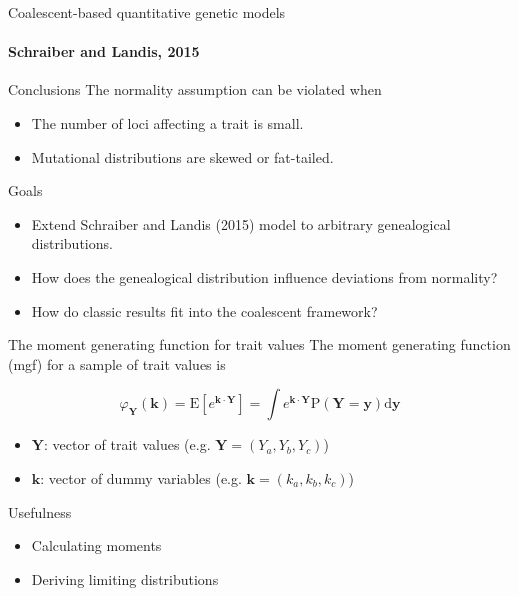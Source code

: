 \documentclass{beamer}
\newcommand{\E}{\mathrm{E}}
\newcommand{\Pro}{\mathrm{P}}
\begin{document}
\begin{frame}{Coalescent-based quantitative genetic models}
  \framesubtitle{Schraiber and Landis, 2015}
  \begin{block}{Conclusions}
    The normality assumption can be violated when
    \begin{itemize}
    \item The number of loci affecting a trait is small.
    \item Mutational distributions are skewed or fat-tailed.
    \end{itemize}
  \end{block}
\end{frame}

\begin{frame}{Goals}
  \begin{itemize}
  \item Extend Schraiber and Landis (2015) model to arbitrary genealogical
    distributions.
  \item How does the genealogical distribution influence deviations from
    normality?
  \item How do classic results fit into the coalescent framework?
  \end{itemize}
\end{frame}

\begin{frame}{The moment generating function for trait values}
  The moment generating function (mgf) for a sample of trait values is 
  \begin{definition}
    \begin{equation*}
      \varphi_{\mathbf{Y}}(\mathbf{k}) = \E\left[ e^{\mathbf{k} \cdot \mathbf{Y}} \right] =
      \int e^{\mathbf{k} \cdot \mathbf{Y}} \Pro(\mathbf{Y}=\mathbf{y}) \mbox{d}\mathbf{y}
    \end{equation*}
  \end{definition}
  \begin{itemize}
  \item $\mathbf{Y}$: vector of trait values (e.g. $\mathbf{Y} = (Y_a, Y_b, Y_c)$)
  \item $\mathbf{k}$: vector of dummy variables (e.g. $\mathbf{k} = (k_a, k_b, k_c)$)
  \end{itemize}
  \begin{block}{Usefulness}
    \begin{itemize}
    \item Calculating moments
    \item Deriving limiting distributions
    \end{itemize}
  \end{block}
\end{frame}
\end{document}
